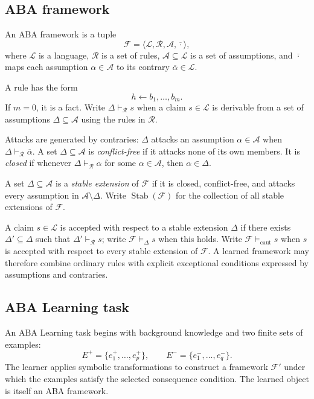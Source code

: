 \documentclass[11pt]{article}
\newcommand{\Epos}{E^{+}}
\newcommand{\Eneg}{E^{-}}
\begin{document}
\subsection{ABA framework}

An ABA framework is a tuple
\[
\mathcal{F}=\langle\mathcal{L},\mathcal{R},\mathcal{A},
\overline{\cdot}\rangle,
\]
where \(\mathcal{L}\) is a language, \(\mathcal{R}\) is a set of rules,
\(\mathcal{A}\subseteq\mathcal{L}\) is a set of assumptions, and
\(\overline{\cdot}\) maps each assumption \(\alpha\in\mathcal{A}\) to its
contrary \(\overline{\alpha}\in\mathcal{L}\).

A rule has the form
\[
h\leftarrow b_1,\ldots,b_m.
\]
If \(m=0\), it is a fact. Write \(\Delta\vdash_{\mathcal{R}} s\) when a claim
\(s\in\mathcal{L}\) is derivable from a set of assumptions
\(\Delta\subseteq\mathcal{A}\) using the rules in \(\mathcal{R}\).

Attacks are generated by contraries: \(\Delta\) attacks an assumption
\(\alpha\in\mathcal{A}\) when \(\Delta\vdash_{\mathcal{R}}\overline{\alpha}\).
A set \(\Delta\subseteq\mathcal{A}\) is \emph{conflict-free} if it attacks none
of its own members. It is \emph{closed} if whenever
\(\Delta\vdash_{\mathcal{R}}\alpha\) for some \(\alpha\in\mathcal{A}\), then
\(\alpha\in\Delta\).

A set \(\Delta\subseteq\mathcal{A}\) is a \emph{stable extension} of
\(\mathcal{F}\) if it is closed, conflict-free, and attacks every assumption
in \(\mathcal{A}\setminus\Delta\). Write \(\operatorname{Stab}(\mathcal{F})\)
for the collection of all stable extensions of \(\mathcal{F}\).

A claim \(s\in\mathcal{L}\) is accepted with respect to a stable extension
\(\Delta\) if there exists \(\Delta'\subseteq\Delta\) such that
\(\Delta'\vdash_{\mathcal{R}} s\); write \(\mathcal{F}\models_{\Delta}s\) when
this holds. Write \(\mathcal{F}\models_{\mathrm{caut}}s\) when \(s\) is
accepted with respect to every stable extension of \(\mathcal{F}\). A learned
framework may therefore combine ordinary rules with explicit exceptional
conditions expressed by assumptions and contraries.

\subsection{ABA Learning task}

An ABA Learning task begins with background knowledge and two finite sets of
examples:
\[
\Epos=\{e^+_1,\ldots,e^+_p\},\qquad
\Eneg=\{e^-_1,\ldots,e^-_q\}.
\]
The learner applies symbolic transformations to construct a framework
\(\mathcal{F}'\) under which the examples satisfy the selected consequence
condition. The learned object is itself an ABA framework.
\end{document}
